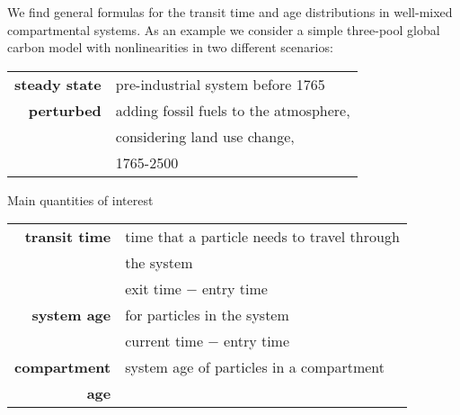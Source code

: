 \begin{minipage}{\textwidth}
We find general formulas for the transit time and age distributions in well-mixed compartmental systems.
As an example we consider a simple three-pool global carbon model
 with nonlinearities in two different scenarios:
\end{minipage}

\begin{tabular}{rl}
\textbf{steady state} & pre-industrial system before 1765 \\
\textbf{perturbed} & adding fossil fuels to the atmosphere,\\
& considering land use change,\\
& 1765-2500
\end{tabular}

{\Large Main quantities of interest}

\begin{minipage}{\textwidth}
	\begin{tabular}{rl}
	 \textbf{transit time} & time that a particle needs to travel through\\
	 & the system\\
	 & exit time $-$ entry time\\
	 \textbf{system age} & for particles in the system\\
	 & current time $-$ entry time\\
	\textbf{compartment} & system age of particles in a compartment \\
	\textbf{age}
\end{tabular}
\end{minipage}
